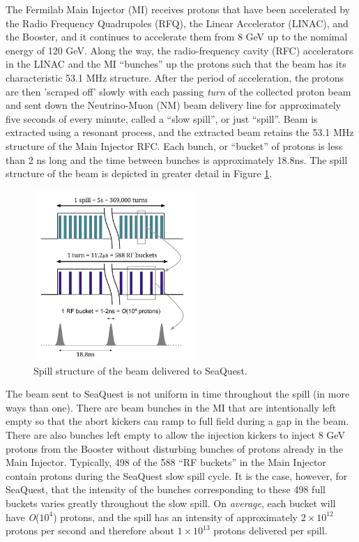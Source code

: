 The Fermilab Main Injector (MI) receives protons that have been accelerated by the Radio Frequency Quadrupoles (RFQ), 
the Linear Accelerator (LINAC), and the Booster, and it continues to accelerate them from 8 GeV up to the nomimal energy
of 120 GeV. Along the way, the radio-frequency cavity (RFC) accelerators in the LINAC and the MI ``bunches'' up the
protons such that the beam has its characteristic 53.1 MHz structure. After the period of acceleration, the protons
are then 'scraped off' slowly with each passing \emph{turn} of the collected proton beam and sent down the
Neutrino-Muon (NM) beam delivery line for approximately five seconds of every minute, called a ``slow spill'', or just
``spill''. Beam is extracted using a resonant process, and the extracted beam retains the 53.1 MHz structure of the
Main Injector RFC. Each bunch, or ``bucket'' of protons is less than 2 ns long and the time between bunches is approximately
18.8ns. The spill structure of the beam is depicted in greater detail in Figure \ref{fig:SpillStructure}.

\begin{figure}
	\begin{center}
		\includegraphics[width=0.55\textwidth]{figures/SpillStructure.pdf}
		\caption{Spill structure of the beam delivered to SeaQuest.}
		\label{fig:SpillStructure}
	\end{center}
\end{figure}

The beam sent to SeaQuest is not uniform in time throughout the spill (in more ways than one).  There are beam bunches in the
MI that are intentionally left empty so that the abort kickers can ramp to full field during a gap in the beam. There are also
bunches left empty to allow the injection kickers to inject 8 GeV protons from the Booster without disturbing bunches of protons
already in the Main Injector.  Typically, 498 of the 588 ``RF buckets'' in the Main Injector contain protons during the SeaQuest
slow spill cycle.  It is the case, however, for SeaQuest, that the intensity of the bunches corresponding to these 498 full
buckets varies greatly throughout the slow spill. On \emph{average}, each bucket will have \emph{O}($10^4$) protons, and the spill
has an intensity of approximately $2\times 10^{12}$ protons per second and therefore about $1\times 10^{13}$ protons delivered per spill.

